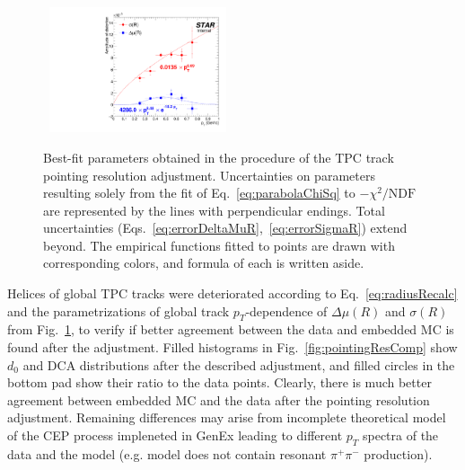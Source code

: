 
  
\begin{figure}\vspace*{-15pt}
  \centering
  ~\includegraphics[width=0.465\textwidth]{graphics/tpcHelixAdj/DistortionVsPt.pdf}\vspace*{-5pt}
  \caption[Best-fit parameters obtained in the procedure of the TPC track pointing resolution adjustment.]
   {Best-fit parameters obtained in the procedure of the TPC track pointing resolution adjustment. Uncertainties on parameters resulting solely from the fit of Eq.~\eqref{eq:parabolaChiSq} to $-\chi^{2}/\text{NDF}$ are represented by the lines with perpendicular endings. Total uncertainties (Eqs.~\eqref{eq:errorDeltaMuR},~\eqref{eq:errorSigmaR}) extend beyond. The empirical functions fitted to points are drawn with corresponding colors, and formula of each is written aside.}
   \label{fig:distortionVsPt}%
\end{figure}
Helices of global TPC tracks were deteriorated according to Eq.~\eqref{eq:radiusRecalc} and the parametrizations of global track $p_{T}$-dependence of $\Delta\mu(R)$ and $\sigma(R)$ from Fig.~\ref{fig:distortionVsPt}, to verify if better agreement between the data and embedded MC is found after the adjustment. Filled histograms in Fig.~\ref{fig:pointingResComp} show $d_{0}$ and DCA distributions after the described adjustment, and filled circles in the bottom pad show their ratio to the data points. Clearly, there is much better agreement between embedded MC and the data after the pointing resolution adjustment. Remaining differences may arise from incomplete theoretical model of the CEP process impleneted in GenEx leading to different $p_{T}$ spectra of the data and the model (e.g. model does not contain resonant $\pi^{+}\pi^{-}$ production).





